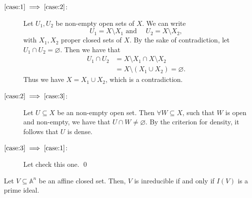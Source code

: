 \documentclass{subfiles}
\begin{document}
    \begin{proof*}
        \begin{description}
            \item [\(\ref{case:1} \implies \ref{case:2}\):] Let \(U_{1}, U_{2}\) be non-empty open sets 
                of \(X\). We can write 
                \[
                    U_{1} = X \setminus X_{1} \text{ and } \quad U_{2} = X \setminus X_{2},
                \]
                with \(X_{1}, X_{2}\) proper closed sets of \(X\).
                By the sake of contradiction, let \(U_{1} \cap U_{2} = \varnothing\).
                Then we have that 
                \[\begin{aligned}
                    U_{1} \cap U_{2} & = X \setminus X_{1} \cap X \setminus X_{2} \\
                        & = X \setminus (X_{1} \cup X_{2}) = \varnothing.
                \end{aligned}\]
                Thus we have \(X = X_{1} \cup X_{2}\), which is a contradiction.

            \item [\(\ref{case:2} \implies \ref{case:3}\):] Let \(U \subseteq X\) be an non-empty open set.
                Then \(\forall W \subseteq X\), such that \(W\) is open and 
                non-empty, we have that \(U \cap W \ne \varnothing\). 
                By the criterion for density, it follows that \(U\) is dense.

            
            \item [\(\ref{case:3} \implies \ref{case:1}\):] Let check this one. %
                \qed
        \end{description}
    \end{proof*}
    \clearpage

    \begin{theorem*}
        Let \(V \subseteq \mathbb{A}^{n}\) be an affine closed set. Then,
        \(V\) is inreducible if and only if \(I(V)\) is a prime ideal.
    \end{theorem*}
\end{document}
